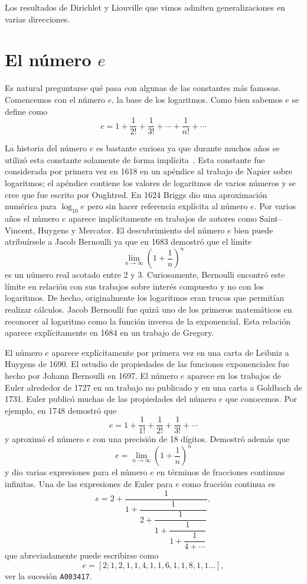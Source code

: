 Los resultados de Dirichlet y Liouville que vimos admiten generalizaciones en
varias direcciones. 


\section*{El número $e$}

Es natural preguntarse qué pasa con algunas de las constantes más famosas.
Comencemos con el número $e$, la base de los logaritmos.  Como bien sabemos $e$
se define como
\[
	e=1+\frac{1}{2!}+\frac{1}{3!}+\cdots+\frac{1}{n!}+\cdots
\]

La historia del número $e$ es bastante curiosa ya que durante muchos años se
utilizó esta constante solamente de forma implícita~\cite{MR38289}. Esta constante fue
considerada por primera vez en 1618 en un apéndice al trabajo de Napier 
sobre logaritmos; el apéndice contiene los valores de logaritmos de varios
números y se cree que fue escrito por Oughtred. En 1624 Briggs dio una
aproximación numérica para $\log_{10}e$ pero sin hacer referencia explícita al
número $e$. Por varios años el número $e$ aparece implícitamente en trabajos de
autores como Saint--Vincent, Huygens y Mercator.  El descubrimiento del número
$e$ bien puede atribuírsele a Jacob Bernoulli ya que en 1683 demostró que el
límite 
\[
	\lim_{n\to\infty}\left(1+\frac1n\right)^n
\]
es un número real acotado entre 2 y 3. Curiosamente, Bernoulli encontró este
límite en relación con sus trabajos sobre interés compuesto y no con los
logaritmos. De hecho, originalmente los logaritmos eran trucos que permitían
realizar cálculos. Jacob Bernoulli fue quizá uno de los primeros matemáticos en
reconocer al logaritmo como la función inversa de la exponencial. Esta relación
aparece explícitamente en 1684 en un trabajo de Gregory.

El número $e$ aparece explícitamente por primera vez en una carta de Leibniz a
Huygens de 1690. El estudio de propiedades de las funciones exponenciales fue
hecho por Johann Bernoulli en 1697. 
El número $e$ aparece en los trabajos de Euler 
alrededor de 1727 en un trabajo no publicado y 
en una carta a Goldbach de 1731. Euler publicó muchas de las propiedades del
número $e$ que conocemos. Por ejemplo, en 1748 demostró que 
\[
	e=1+\frac{1}{1!}+\frac{1}{2!}+\frac{1}{3!}+\cdots
\]
y aproximó el número $e$ con una precisión de 18 dígitos. Demostró además que 
\[
	e=\lim_{n\to\infty}\left(1+\frac1n\right)^n
\]
y dio varias expresiones para el número $e$ en términos de fracciones continuas
infinitas. Una de las expresiones de Euler para $e$ como fracción continua es 
\[
	e=2+\dfrac{1}{1+\dfrac{1}{2+\dfrac{1}{1+\dfrac{1}{1+\dfrac{1}{4+\cdots}}}}},
\]
que abreviadamente puede escribirse como
\[
	e = [2;1,2,1,1,4,1,1,6,1,1,8,1,1\dots],
\]
ver la sucesión \verb+A003417+.

